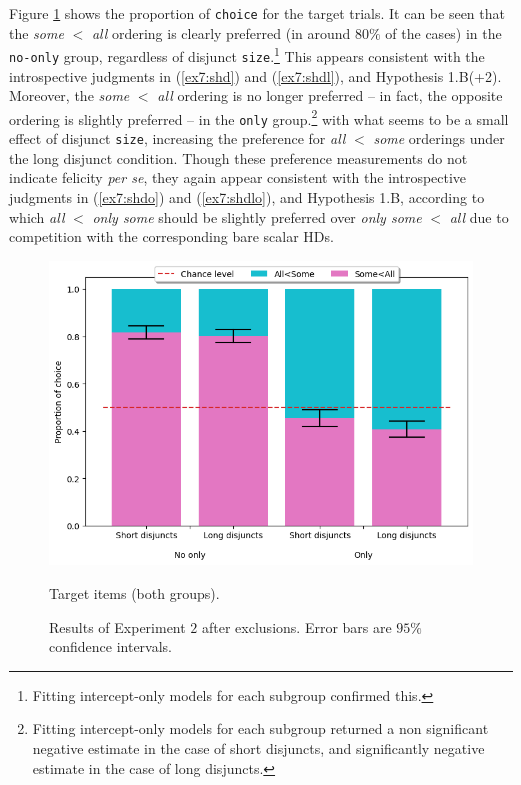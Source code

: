 Figure \ref{fig7:exp2-targets} shows the proportion of \texttt{choice} for the target trials. It can be seen that the \textit{some} $<$ \textit{all} ordering is clearly preferred (in around $80\%$ of the cases) in the \texttt{no-only} group, regardless of disjunct \texttt{size}.\footnote{Fitting intercept-only models for each subgroup confirmed this. } This appears consistent with the introspective judgments in (\ref{ex7:shd}) and (\ref{ex7:shdl}), and Hypothesis 1.B(+2). Moreover, the \textit{some} $<$ \textit{all} ordering is no longer preferred -- in fact, the opposite ordering is slightly preferred -- in the \texttt{only} group.\footnote{Fitting intercept-only models for each subgroup returned a non significant negative estimate in the case of short disjuncts, and significantly negative estimate in the case of long disjuncts.} with what seems to be a small effect of disjunct \texttt{size}, increasing the preference for \textit{all} $<$ \textit{some} orderings under the long disjunct condition. Though these preference measurements do not indicate felicity \textit{per se}, they again appear consistent with the introspective judgments in (\ref{ex7:shdo}) and (\ref{ex7:shdlo}), and Hypothesis 1.B, according to which \textit{all} $<$ \textit{only some} should be slightly preferred over \textit{only some} $<$ \textit{all} due to competition with the corresponding bare scalar HDs.



\begin{figure}[H]

		\centering
		\includegraphics[width=.6\linewidth]{./images/exp2-targets.png}
		\caption{Target items (both groups).}\label{fig7:exp2-targets}
	\caption{Results of Experiment $2$ after exclusions. Error bars are $95\%$ confidence intervals.}
\end{figure}

